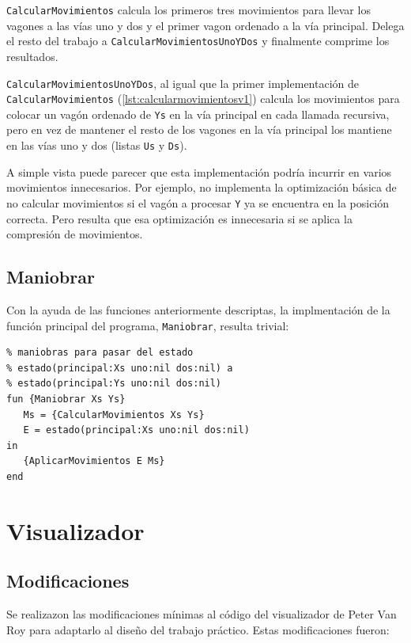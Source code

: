 \documentclass[12pt,titlepage]{article}
\begin{document}
\lstinline|CalcularMovimientos| calcula los primeros tres movimientos para llevar los vagones a las vías uno y dos y el primer vagon ordenado a la vía principal. Delega el resto del trabajo a \lstinline|CalcularMovimientosUnoYDos| y finalmente comprime los resultados.

\lstinline|CalcularMovimientosUnoYDos|, al igual que la primer implementación de \lstinline|CalcularMovimientos| (\ref{lst:calcularmovimientosv1}) calcula los movimientos para colocar un vagón ordenado de \lstinline|Ys| en la vía principal en cada llamada recursiva, pero en vez de mantener el resto de los vagones en la vía principal los mantiene en las vías uno y dos (listas \lstinline|Us| y \lstinline|Ds|).

A simple vista puede parecer que esta implementación podría incurrir en varios movimientos innecesarios. Por ejemplo, no implementa la optimización básica de no calcular movimientos si el vagón a procesar \lstinline|Y| ya se encuentra en la posición correcta. Pero resulta que esa optimización es innecesaria si se aplica la compresión de movimientos.

\subsection{Maniobrar}

Con la ayuda de las funciones anteriormente descriptas, la implmentación de la función principal del programa, \lstinline|Maniobrar|, resulta trivial:
\begin{lstlisting}[basicstyle=\ttfamily\footnotesize]
% Devuelve una lista de estados por los que tiene que pasar la playa de 
% maniobras para pasar del estado
% estado(principal:Xs uno:nil dos:nil) a
% estado(principal:Ys uno:nil dos:nil)
fun {Maniobrar Xs Ys}
   Ms = {CalcularMovimientos Xs Ys}
   E = estado(principal:Xs uno:nil dos:nil)
in
   {AplicarMovimientos E Ms}
end
\end{lstlisting}

\section{Visualizador}

\subsection{Modificaciones}

Se realizazon las modificaciones mínimas al código del visualizador de Peter Van Roy para adaptarlo al diseño del trabajo práctico. Estas modificaciones fueron:
\end{document}
